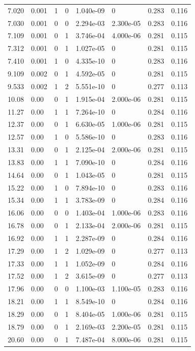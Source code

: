 \documentclass[preview]{standalone}
\begin{document}
{{\begin{tabular}{L{1.2cm}C{1.2cm} C{0.3cm}C{0.5cm} C{1.4cm}C{1.4cm} C{1.4cm}C{1.4cm}}
  7.020  &  0.001  & 1     &  0 &  1.040e-09  & 0  & 0.283 &  0.116   \\ 
  7.030  &  0.001  & 0     &  0 &  2.294e-03  & 2.300e-05  & 0.283 &  0.116   \\ 
  7.109  &  0.001  & 0     &  1 &  3.746e-04  & 4.000e-06  & 0.281 &  0.115   \\ 
  7.312  &  0.001  & 0     &  1 &  1.027e-05  & 0  & 0.281 &  0.115   \\ 
  7.410  &  0.001  & 1     &  0 &  4.335e-10  & 0  & 0.283 &  0.116   \\ 
  9.109  &  0.002  & 0     &  1 &  4.592e-05  & 0  & 0.281 &  0.115   \\ 
  9.533  &  0.002  & 1     &  2 &  5.551e-10  & 0  & 0.277 &  0.113   \\ 
  10.08  &  0.00  & 0     &  1 &  1.915e-04  & 2.000e-06  & 0.281 &  0.115   \\ 
  11.27  &  0.00  & 1     &  1 &  7.264e-10  & 0  & 0.284 &  0.116   \\ 
  12.37  &  0.00  & 0     &  1 &  6.630e-05  & 1.000e-06  & 0.281 &  0.115   \\ 
  12.57  &  0.00  & 1     &  0 &  5.586e-10  & 0  & 0.283 &  0.116   \\ 
  13.31  &  0.00  & 0     &  1 &  2.125e-04  & 2.000e-06  & 0.281 &  0.115   \\ 
  13.83  &  0.00  & 1     &  1 &  7.090e-10  & 0  & 0.284 &  0.116   \\ 
  14.64  &  0.00  & 0     &  1 &  1.043e-05  & 0  & 0.281 &  0.115   \\ 
  15.22  &  0.00  & 1     &  0 &  7.894e-10  & 0  & 0.283 &  0.116   \\ 
  15.34  &  0.00  & 1     &  1 &  3.783e-09  & 0  & 0.284 &  0.116   \\ 
  16.06  &  0.00  & 0     &  0 &  1.403e-04  & 1.000e-06  & 0.283 &  0.116   \\ 
  16.78  &  0.00  & 0     &  1 &  2.133e-04  & 2.000e-06  & 0.281 &  0.115   \\ 
  16.92  &  0.00  & 1     &  1 &  2.287e-09  & 0  & 0.284 &  0.116   \\ 
  17.29  &  0.00  & 1     &  2 &  1.029e-09  & 0  & 0.277 &  0.113   \\ 
  17.33  &  0.00  & 1     &  1 &  1.052e-09  & 0  & 0.284 &  0.116   \\ 
  17.52  &  0.00  & 1     &  2 &  3.615e-09  & 0  & 0.277 &  0.113   \\ 
  17.96  &  0.00  & 0     &  0 &  1.100e-03  & 1.100e-05  & 0.283 &  0.116   \\ 
  18.21  &  0.00  & 1     &  1 &  8.549e-10  & 0  & 0.284 &  0.116   \\ 
  18.29  &  0.00  & 0     &  1 &  8.404e-05  & 1.000e-06  & 0.281 &  0.115   \\ 
  18.79  &  0.00  & 0     &  1 &  2.169e-03  & 2.200e-05  & 0.281 &  0.115   \\ 
  20.60  &  0.00  & 0     &  1 &  7.487e-04  & 8.000e-06  & 0.281 &  0.115   \\ 
\hline 
\end{tabular} 

}}
\end{document}
